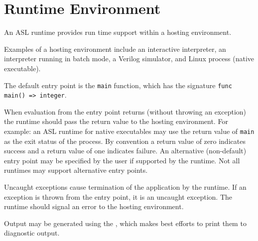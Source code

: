 \chapter{Runtime Environment\label{chap:RuntimeEnvironment}}

An ASL runtime provides run time support within a hosting environment.

Examples of a hosting environment include an interactive interpreter,
an interpreter running in batch mode,
a Verilog simulator, and Linux process (native executable).

The default entry point is the \texttt{main} function, which has the signature
\verb|func main() => integer|.

When evaluation from the entry point returns (without throwing an exception)
the runtime should pass the return value to the hosting environment.
%
For example: an ASL runtime for native executables may use the return value
of \texttt{main} as the exit status of the process.
%
By convention a return value of zero indicates success and a return value of
one indicates failure.
%
An alternative (non-default) entry point may be specified by the user if
supported by the runtime. Not all runtimes may support alternative entry points.

Uncaught exceptions cause termination of the application by the runtime.
If an exception is thrown from the entry point, it is an uncaught exception.
The runtime should signal an error to the hosting environment.

Output may be generated using the \printstatementterm, which makes
best efforts to print them to diagnostic output.
